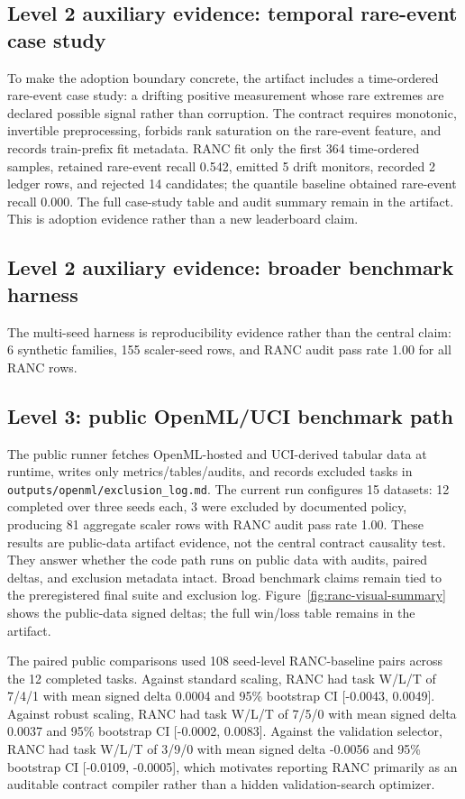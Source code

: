 \documentclass{article}
\begin{document}
\subsection{Level 2 auxiliary evidence: temporal rare-event case study}

To make the adoption boundary concrete, the artifact includes a time-ordered
rare-event case study: a drifting positive measurement whose rare extremes are
declared possible signal rather than corruption. The contract requires
monotonic, invertible preprocessing, forbids rank saturation on the rare-event
feature, and records train-prefix fit metadata. RANC fit only the first 364
time-ordered samples, retained rare-event recall 0.542, emitted 5 drift
monitors, recorded 2 ledger rows, and rejected 14 candidates; the quantile
baseline obtained rare-event recall 0.000. The full case-study table and audit
summary remain in the artifact. This is adoption evidence rather than a new
leaderboard claim.

\subsection{Level 2 auxiliary evidence: broader benchmark harness}

The multi-seed harness is reproducibility evidence rather than the central
claim: 6 synthetic families, 155 scaler-seed rows, and RANC audit pass rate 1.00
for all RANC rows.

\subsection{Level 3: public OpenML/UCI benchmark path}

The public runner fetches OpenML-hosted and UCI-derived tabular data at runtime,
writes only metrics/tables/audits, and records excluded tasks in
\texttt{outputs/openml/exclusion\_log.md}. The current run configures 15
datasets: 12 completed over three seeds each, 3 were excluded by documented
policy, producing 81 aggregate scaler rows with RANC audit pass rate 1.00.
These results are public-data artifact evidence, not the central contract
causality test. They answer whether the code path runs on public data with
audits, paired deltas, and exclusion metadata intact. Broad benchmark claims
remain tied to the preregistered final suite and exclusion log.
Figure~\ref{fig:ranc-visual-summary} shows the public-data signed deltas; the
full win/loss table remains in the artifact.

The paired public comparisons used 108 seed-level RANC-baseline pairs across
the 12 completed tasks. Against standard scaling, RANC had task W/L/T of
7/4/1 with mean signed delta 0.0004 and 95\% bootstrap CI [-0.0043, 0.0049].
Against robust scaling, RANC had task W/L/T of 7/5/0 with mean signed delta
0.0037 and 95\% bootstrap CI [-0.0002, 0.0083]. Against the validation selector,
RANC had task W/L/T of 3/9/0 with mean signed delta -0.0056 and 95\% bootstrap
CI [-0.0109, -0.0005], which motivates reporting RANC primarily as an auditable
contract compiler rather than a hidden validation-search optimizer.
\end{document}
